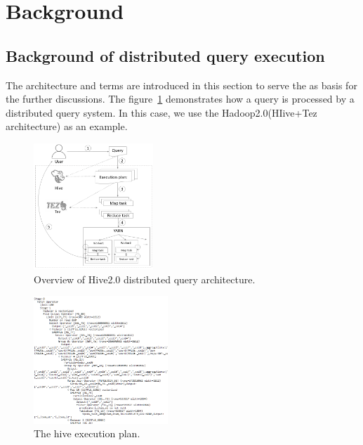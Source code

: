 \section{Background}
\subsection{Background of distributed query execution}
The architecture and terms are introduced in this section to serve the as basis for the further discussions. 
The figure~\ref{fig:architecture} demonstrates how a query is processed by a distributed query system. In this case, we use the Hadoop2.0(HIive+Tez architecture) as an example.

\begin{figure}[t]
	\centering
	\includegraphics[width=0.40\textwidth]{figures/background/arc.png}
	\vspace{-3mm}
	\caption{Overview of Hive2.0 distributed query architecture.}
	\label{fig:architecture}
	\vspace{-3mm}
\end{figure}


\begin{figure}[t]
	\centering
	\includegraphics[width=0.45\textwidth]{figures/background/execution_plan.png}
	\vspace{-3mm}
	\caption{The hive execution plan.}
	\label{fig:exec_plan}
	\vspace{-3mm}
\end{figure}

